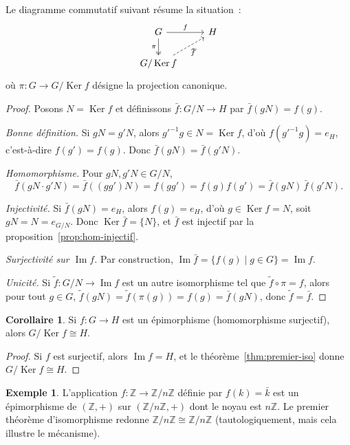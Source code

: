 \documentclass[12pt,a4paper,openany]{book}
\theoremstyle{definition}
\newtheorem{corollaire}{Corollaire}[chapter]
\newtheorem{exemple}{Exemple}[chapter]
\newcommand{\Z}{\mathbb{Z}}
\DeclareMathOperator{\Ker}{Ker}
\renewcommand{\Im}{\operatorname{Im}}
\begin{document}
Le diagramme commutatif suivant résume la situation~:
\[
\begin{tikzcd}
  G \arrow[r,"f"] \arrow[d,"\pi"',twoheadrightarrow]
    & H \\
  G/\Ker f \arrow[ru,"\bar{f}"',dashed,"\sim"']
\end{tikzcd}
\]
où $\pi\colon G\to G/\Ker f$ désigne la projection canonique.

\begin{proof}
  Posons $N=\Ker f$ et définissons $\bar{f}\colon G/N\to H$ par
  $\bar{f}(gN) = f(g)$.

  \medskip

  \emph{Bonne définition.} Si $gN = g'N$, alors $g'^{-1}g\in N=\Ker f$,
  d'où $f(g'^{-1}g) = e_H$, c'est-à-dire $f(g') = f(g)$.
  Donc $\bar{f}(gN) = \bar{f}(g'N)$.

  \medskip

  \emph{Homomorphisme.} Pour $gN,g'N\in G/N$,
  \[
    \bar{f}(gN\cdot g'N) = \bar{f}((gg')N) = f(gg') = f(g)f(g')
    = \bar{f}(gN)\,\bar{f}(g'N).
  \]

  \emph{Injectivité.} Si $\bar{f}(gN) = e_H$, alors $f(g)=e_H$, d'où
  $g\in\Ker f = N$, soit $gN = N = e_{G/N}$.
  Donc $\Ker\bar{f} = \{N\}$, et $\bar{f}$ est injectif par la
  proposition~\ref{prop:hom-injectif}.

  \medskip

  \emph{Surjectivité sur $\Im f$.} Par construction,
  $\Im\bar{f} = \{f(g)\mid g\in G\} = \Im f$.

  \medskip

  \emph{Unicité.} Si $\tilde{f}\colon G/N\to\Im f$ est un autre
  isomorphisme tel que $\tilde{f}\circ\pi = f$, alors pour tout $g\in G$,
  $\tilde{f}(gN) = \tilde{f}(\pi(g)) = f(g) = \bar{f}(gN)$, donc
  $\tilde{f}=\bar{f}$.
\end{proof}

\begin{corollaire}\label{cor:premier-iso-surjectif}
  Si $f\colon G\to H$ est un épimorphisme (homomorphisme surjectif),
  alors $G/\Ker f\cong H$.
\end{corollaire}

\begin{proof}
  Si $f$ est surjectif, alors $\Im f = H$, et le
  théorème~\ref{thm:premier-iso} donne $G/\Ker f\cong H$.
\end{proof}

\begin{exemple}\label{ex:iso-Zn}
  L'application $f\colon\Z\to\Z/n\Z$ définie par $f(k) = \bar{k}$ est
  un épimorphisme de $(\Z,+)$ sur $(\Z/n\Z,+)$ dont le noyau est
  $n\Z$. Le premier théorème d'isomorphisme redonne
  $\Z/n\Z \cong \Z/n\Z$ (tautologiquement, mais cela illustre le
  mécanisme).
\end{exemple}
\end{document}
